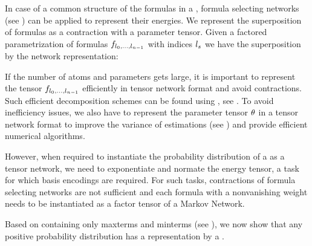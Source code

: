 In case of a common structure of the formulas in a \MarkovLogicNetwork{}, formula selecting networks (see ) can be applied to represent their energies.
We represent the superposition of formulas as a contraction with a parameter tensor.
Given a factored parametrization of formulas $f_{l_{0},\ldots,l_{n-1}}$ with indices $l_{s}$ we have the superposition by the network representation:
\begin{center}
    
\end{center}


If the number of atoms and parameters gets large, it is important to represent the tensor ${f_{l_{0},\ldots,l_{n-1}}}$ efficiently in tensor network format and avoid contractions.
Such efficient decomposition schemes can be found using \decompositionSparsity{}, see .
To avoid inefficiency issues, we also have to represent the parameter tensor $\theta$ in a tensor network format to improve the variance of estimations (see ) and provide efficient numerical algorithms.

However, when required to instantiate the probability distribution of a \MarkovLogicNetwork{} as a tensor network, we need to exponentiate and normate the energy tensor, a task for which basis encodings are required.
For such tasks, contractions of formula selecting networks are not sufficient and each formula with a nonvanishing weight needs to be instantiated as a factor tensor of a Markov Network.






\label{sec:MLNMaxMintermRep}

Based on \MarkovLogicNetworks{} containing only maxterms and minterms (see ), we now show that any positive probability distribution has a representation by a \MarkovLogicNetwork{}.


